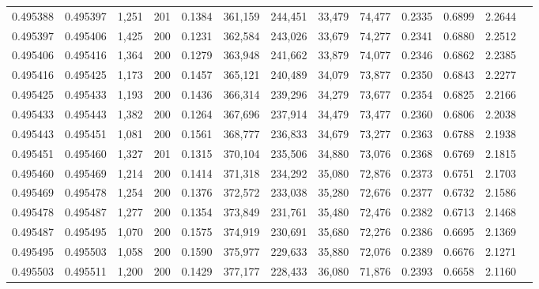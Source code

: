 \begin{tabular}{rrrrrrrrrrrrr}
0.495388 & 0.495397 & 1,251 & 201 &                                     0.1384 & 361,159 & 244,451 &  33,479 &  74,477 & 0.2335 & 0.6899 & 2.2644 \\
0.495397 & 0.495406 & 1,425 & 200 &                                     0.1231 & 362,584 & 243,026 &  33,679 &  74,277 & 0.2341 & 0.6880 & 2.2512 \\
0.495406 & 0.495416 & 1,364 & 200 &                                     0.1279 & 363,948 & 241,662 &  33,879 &  74,077 & 0.2346 & 0.6862 & 2.2385 \\
0.495416 & 0.495425 & 1,173 & 200 &                                     0.1457 & 365,121 & 240,489 &  34,079 &  73,877 & 0.2350 & 0.6843 & 2.2277 \\
0.495425 & 0.495433 & 1,193 & 200 &                                     0.1436 & 366,314 & 239,296 &  34,279 &  73,677 & 0.2354 & 0.6825 & 2.2166 \\
0.495433 & 0.495443 & 1,382 & 200 &                                     0.1264 & 367,696 & 237,914 &  34,479 &  73,477 & 0.2360 & 0.6806 & 2.2038 \\
0.495443 & 0.495451 & 1,081 & 200 &                                     0.1561 & 368,777 & 236,833 &  34,679 &  73,277 & 0.2363 & 0.6788 & 2.1938 \\
0.495451 & 0.495460 & 1,327 & 201 &                                     0.1315 & 370,104 & 235,506 &  34,880 &  73,076 & 0.2368 & 0.6769 & 2.1815 \\
0.495460 & 0.495469 & 1,214 & 200 &                                     0.1414 & 371,318 & 234,292 &  35,080 &  72,876 & 0.2373 & 0.6751 & 2.1703 \\
0.495469 & 0.495478 & 1,254 & 200 &                                     0.1376 & 372,572 & 233,038 &  35,280 &  72,676 & 0.2377 & 0.6732 & 2.1586 \\
0.495478 & 0.495487 & 1,277 & 200 &                                     0.1354 & 373,849 & 231,761 &  35,480 &  72,476 & 0.2382 & 0.6713 & 2.1468 \\
0.495487 & 0.495495 & 1,070 & 200 &                                     0.1575 & 374,919 & 230,691 &  35,680 &  72,276 & 0.2386 & 0.6695 & 2.1369 \\
0.495495 & 0.495503 & 1,058 & 200 &                                     0.1590 & 375,977 & 229,633 &  35,880 &  72,076 & 0.2389 & 0.6676 & 2.1271 \\
0.495503 & 0.495511 & 1,200 & 200 &                                     0.1429 & 377,177 & 228,433 &  36,080 &  71,876 & 0.2393 & 0.6658 & 2.1160 \\

\end{tabular}
